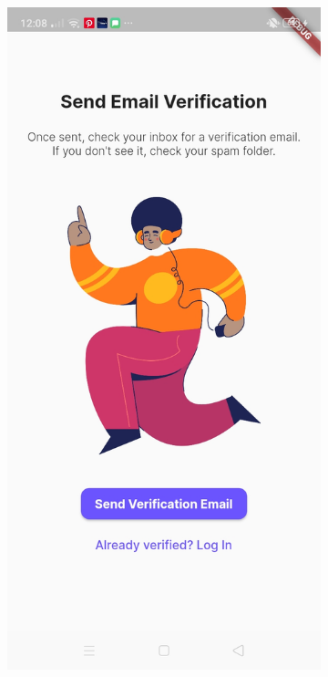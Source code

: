 \begin{figure}[!h]
    \centering
    \begin{subfigure}[c]{0.30\linewidth}
        \centering
        \includegraphics[scale=0.15]{figures/Chapter4/Main/Verification-1.jpg}

\end{subfigure}
\end{figure}
